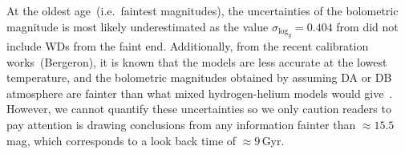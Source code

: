 \documentclass[fleqn,usenatbib]{mnras}
\begin{document}
At the oldest age~(i.e.\ faintest magnitudes), the uncertainties of the
bolometric magnitude is most likely underestimated as the value
$\sigma_{\mathrm{log}_{g}} = 0.404$ from \citet{2014ApJ...796..128G} did not
include WDs from the faint end. Additionally, from the recent calibration
works~(Bergeron), it is known that the models are less accurate at the lowest 
temperature, and the bolometric magnitudes obtained by assuming DA or DB
atmosphere are fainter than what mixed hydrogen-helium models would
give~\citep{2022ApJ...934...36B}. However, we cannot quantify these uncertainties
so we only caution readers to pay attention is drawing conclusions from any
information fainter than $\approx15.5$\,mag, which corresponds to a look back
time of $\approx9$\,Gyr.
\end{document}
